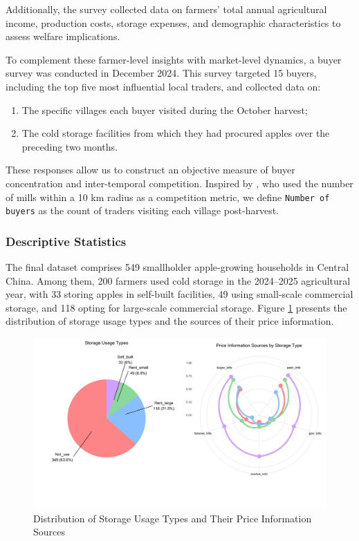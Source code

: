 \documentclass[12pt]{article}
\begin{document}
Additionally, the survey collected data on farmers' total annual agricultural income, production costs, storage expenses, and demographic characteristics to assess welfare implications.

To complement these farmer-level insights with market-level dynamics, a buyer survey was conducted in December 2024. This survey targeted 15 buyers, including the top five most influential local traders, and collected data on:
\begin{enumerate}
    \item The specific villages each buyer visited during the October harvest;
    \item The cold storage facilities from which they had procured apples over the preceding two months.
\end{enumerate}
These responses allow us to construct an objective measure of buyer concentration and inter-temporal competition. Inspired by \cite{macchiavello2021competition}, who used the number of mills within a 10 km radius as a competition metric, we define \texttt{Number of buyers} as the count of traders visiting each village post-harvest.

\subsubsection{Descriptive Statistics}
\noindent The final dataset comprises 549 smallholder apple-growing households in Central China. Among them, 200 farmers used cold storage in the 2024–2025 agricultural year, with 33 storing apples in self-built facilities, 49 using small-scale commercial storage, and 118 opting for large-scale commercial storage. Figure \ref{Figure: pie and radar chart} presents the distribution of storage usage types and the sources of their price information. 

\begin{figure}[htp]
\centering
\includegraphics[width=1\textwidth]{figures/storage_usage_analysis_soft_colors.png}
\caption{Distribution of Storage Usage Types and Their Price Information Sources}
\label{Figure: pie and radar chart}
\end{figure}
\end{document}
